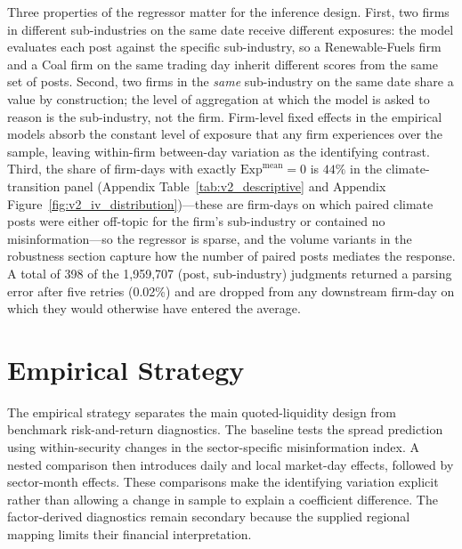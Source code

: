 \documentclass{article}
\theoremstyle{plain}
\begin{document}
Three properties of the regressor matter for the inference design. First, two firms in different sub-industries on the same date receive different exposures: the model evaluates each post against the specific sub-industry, so a Renewable-Fuels firm and a Coal firm on the same trading day inherit different scores from the same set of posts. Second, two firms in the \emph{same} sub-industry on the same date share a value by construction; the level of aggregation at which the model is asked to reason is the sub-industry, not the firm. Firm-level fixed effects in the empirical models absorb the constant level of exposure that any firm experiences over the sample, leaving within-firm between-day variation as the identifying contrast. Third, the share of firm-days with exactly $\mathrm{Exp}^{\text{mean}}=0$ is $44\%$ in the climate-transition panel (Appendix Table~\ref{tab:v2_descriptive} and Appendix Figure~\ref{fig:v2_iv_distribution})---these are firm-days on which paired climate posts were either off-topic for the firm's sub-industry or contained no misinformation---so the regressor is sparse, and the volume variants in the robustness section capture how the number of paired posts mediates the response. A total of 398 of the 1,959,707 (post, sub-industry) judgments returned a parsing error after five retries (0.02\%) and are dropped from any downstream firm-day on which they would otherwise have entered the average.

\section{Empirical Strategy}
\label{sec:model}

The empirical strategy separates the main quoted-liquidity design from benchmark risk-and-return diagnostics. The baseline tests the spread prediction using within-security changes in the sector-specific misinformation index. A nested comparison then introduces daily and local market-day effects, followed by sector-month effects. These comparisons make the identifying variation explicit rather than allowing a change in sample to explain a coefficient difference. The factor-derived diagnostics remain secondary because the supplied regional mapping limits their financial interpretation.
\end{document}
